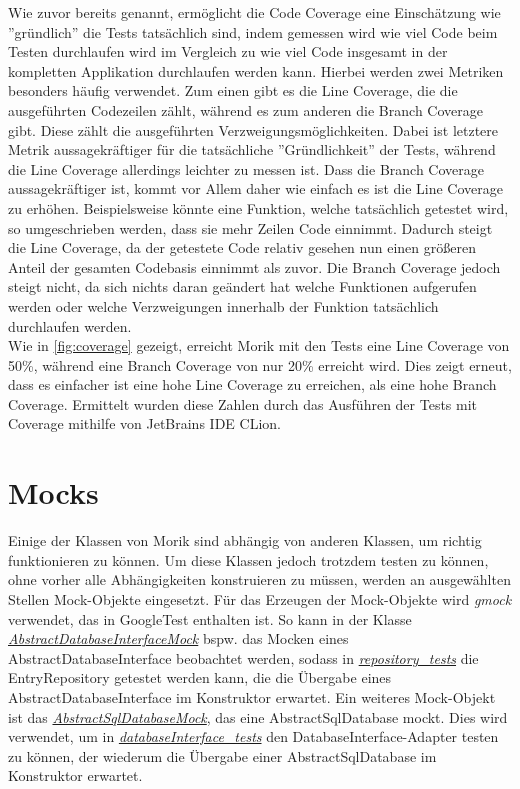Wie zuvor bereits genannt, ermöglicht die Code Coverage eine Einschätzung wie ''gründlich'' die Tests tatsächlich sind, indem gemessen wird wie viel Code beim Testen durchlaufen wird im Vergleich zu wie viel Code insgesamt in der kompletten Applikation durchlaufen werden kann. Hierbei werden zwei Metriken besonders häufig verwendet. Zum einen gibt es die Line Coverage, die die ausgeführten Codezeilen zählt, während es zum anderen die Branch Coverage gibt. Diese zählt die ausgeführten Verzweigungsmöglichkeiten. Dabei ist letztere Metrik aussagekräftiger für die tatsächliche ''Gründlichkeit'' der Tests, während die Line Coverage allerdings leichter zu messen ist. Dass die Branch Coverage aussagekräftiger ist, kommt vor Allem daher wie einfach es ist die Line Coverage zu erhöhen. Beispielsweise könnte eine Funktion, welche tatsächlich getestet wird, so umgeschrieben werden, dass sie mehr Zeilen Code einnimmt. Dadurch steigt die Line Coverage, da der getestete Code relativ gesehen nun einen größeren Anteil der gesamten Codebasis einnimmt als zuvor. Die Branch Coverage jedoch steigt nicht, da sich nichts daran geändert hat welche Funktionen aufgerufen werden oder welche Verzweigungen innerhalb der Funktion tatsächlich durchlaufen werden.\\
Wie in \autoref{fig:coverage} gezeigt, erreicht Morik mit den Tests eine Line Coverage von 50\%, während eine Branch Coverage von nur 20\% erreicht wird. Dies zeigt erneut, dass es einfacher ist eine hohe Line Coverage zu erreichen, als eine hohe Branch Coverage. Ermittelt wurden diese Zahlen durch das Ausführen der Tests mit Coverage mithilfe von JetBrains IDE CLion.

\section{Mocks}
Einige der Klassen von Morik sind abhängig von anderen Klassen, um richtig funktionieren zu können. Um diese Klassen jedoch trotzdem testen zu können, ohne vorher alle Abhängigkeiten konstruieren zu müssen, werden an ausgewählten Stellen Mock-Objekte eingesetzt. Für das Erzeugen der Mock-Objekte wird \textit{gmock} verwendet, das in GoogleTest enthalten ist. So kann in der Klasse \href{https://github.com/moorts/Morik/blob/main/src/tests/application/AbstractDatabaseInterfaceMock.h}{\textit{AbstractDatabaseInterfaceMock}} bspw. das Mocken eines AbstractDatabaseInterface beobachtet werden, sodass in \href{https://github.com/moorts/Morik/blob/main/src/tests/application/repository_tests.cpp}{\textit{repository\_tests}} die EntryRepository getestet werden kann, die die Übergabe eines AbstractDatabaseInterface im Konstruktor erwartet. Ein weiteres Mock-Objekt ist das \href{https://github.com/moorts/Morik/blob/main/src/tests/adapters/database/AbstractSqlDatabaseMock.h}{\textit{AbstractSqlDatabaseMock}}, das eine AbstractSqlDatabase mockt. Dies wird verwendet, um in \href{https://github.com/moorts/Morik/blob/main/src/tests/adapters/database/databaseInterface_tests.cpp}{\textit{databaseInterface\_tests}} den DatabaseInterface-Adapter testen zu können, der wiederum die Übergabe einer AbstractSqlDatabase im Konstruktor erwartet.
